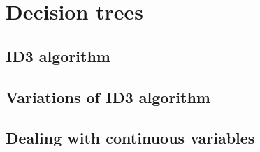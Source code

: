 \section{Decision trees}
\setcounter{figure}{0}




\subsection{ID3 algorithm}
\subsection{Variations  of ID3 algorithm}
\subsection{Dealing with continuous variables}